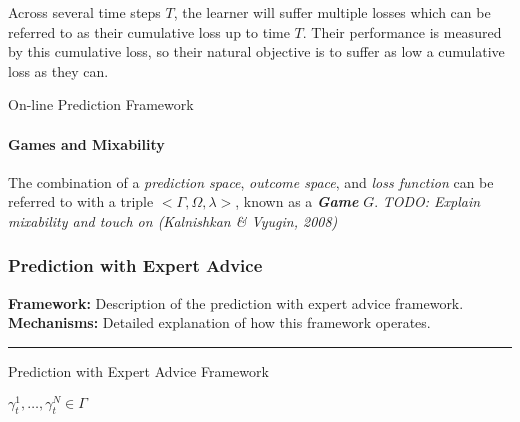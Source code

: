Across several time steps $T$, the learner will suffer multiple losses which can be referred to as their cumulative loss up to time $T$. Their performance is measured by this cumulative loss, so their natural objective is to suffer as low a cumulative loss as they can.

\begin{protocol}[H]
    \caption{On-line Prediction Framework}\label{on-line_prediction_framework}
    \begin{algorithmic}[1]
    \end{algorithmic}
\end{protocol}

\paragraph{Games and Mixability}
The combination of a \textit{prediction space}, \textit{outcome space}, and \textit{loss function} can be referred to with a triple $<\Gamma, \Omega, \lambda>$, known as a \textit{\textbf{Game}} $G$. \textit{TODO: Explain mixability and touch on (Kalnishkan \& Vyugin, 2008)}~\cite{kalnishkan/vyugin:2008} 

\subsubsection{Prediction with Expert Advice}
\textbf{Framework:} Description of the prediction with expert advice framework.\newline
\textbf{Mechanisms:} Detailed explanation of how this framework operates.\newline
\noindent\rule{\textwidth}{0.1pt}
\begin{protocol}[H]
    \caption{Prediction with Expert Advice Framework}\label{alg:cap}
    \begin{algorithmic}[1]
        $\gamma^1_t, \ldots, \gamma^N_t \in \Gamma$
    \end{algorithmic}
\end{protocol}


